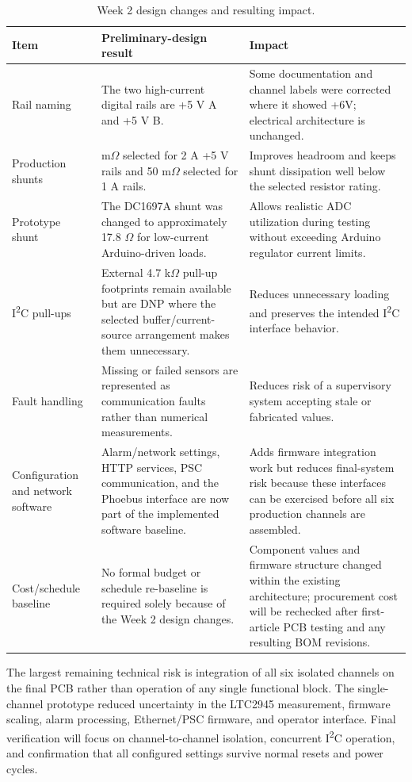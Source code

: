 \begin{table}[H]
    \centering
    \caption{Week 2 design changes and resulting impact.}
    \label{tab:w2-changes}
    \begin{tabularx}{\textwidth}{>{\raggedright\arraybackslash}p{}>{\raggedright\arraybackslash}p{}X}
        \toprule
        \textbf{Item} & \textbf{Preliminary-design result} & \textbf{Impact} \\
        \midrule
        Rail naming & The two high-current digital rails are +5 V A and +5 V B. & Some documentation and channel labels were corrected where it showed +6V; electrical architecture is unchanged. \\
        Production shunts & 39 m\(\Omega\) selected for 2 A +5 V rails and 50 m\(\Omega\) selected for 1 A rails. & Improves headroom and keeps shunt dissipation well below the selected resistor rating. \\
        Prototype shunt & The DC1697A shunt was changed to approximately 17.8 \(\Omega\) for low-current Arduino-driven loads. & Allows realistic ADC utilization during testing without exceeding Arduino regulator current limits. \\
        I\textsuperscript{2}C pull-ups & External 4.7 k\(\Omega\) pull-up footprints remain available but are DNP where the selected buffer/current-source arrangement makes them unnecessary. & Reduces unnecessary loading and preserves the intended I\textsuperscript{2}C interface behavior. \\
        Fault handling & Missing or failed sensors are represented as communication faults rather than numerical measurements. & Reduces risk of a supervisory system accepting stale or fabricated values. \\
        Configuration and network software & Alarm/network settings, HTTP services, PSC communication, and the Phoebus interface are now part of the implemented software baseline. & Adds firmware integration work but reduces final-system risk because these interfaces can be exercised before all six production channels are assembled. \\
        Cost/schedule baseline & No formal budget or schedule re-baseline is required solely because of the Week 2 design changes. & Component values and firmware structure changed within the existing architecture; procurement cost will be rechecked after first-article PCB testing and any resulting BOM revisions. \\
        \bottomrule
    \end{tabularx}
\end{table}

The largest remaining technical risk is integration of all six isolated channels
on the final PCB rather than operation of any single functional block. The
single-channel prototype reduced uncertainty in the LTC2945 measurement,
firmware scaling, alarm processing, Ethernet/PSC firmware, and operator interface.
Final verification will focus on channel-to-channel isolation,
concurrent I\textsuperscript{2}C operation, and confirmation that all configured settings survive normal resets and power cycles.